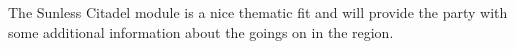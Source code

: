 The Sunless Citadel module is a nice thematic fit and will provide the party with some additional information about the goings on in the region.
